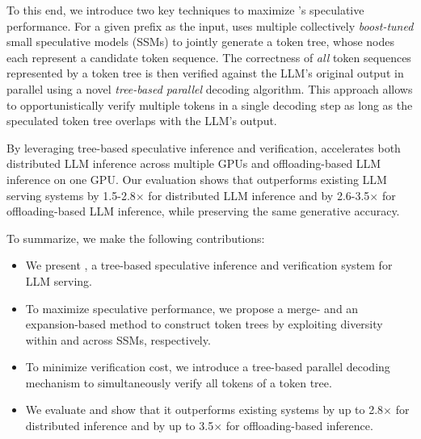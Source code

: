 To this end, we introduce two key techniques to maximize \sys's speculative performance. 
For a given prefix as the input, \Sys uses multiple collectively {\em boost-tuned} small speculative models (SSMs) to jointly generate a token tree, whose nodes each represent a candidate token sequence.
The correctness of {\em all} token sequences represented by a token tree is then verified against the LLM's original output in parallel using a novel {\em tree-based parallel} decoding algorithm.
This approach allows \Sys to opportunistically verify multiple tokens in a single decoding step as long as the speculated token tree overlaps with the LLM's output.
\fi 

By leveraging tree-based speculative inference and verification, \Sys accelerates both distributed LLM inference across multiple GPUs and offloading-based LLM inference on one GPU.
Our evaluation shows that \Sys outperforms existing LLM serving systems by 1.5-2.8$\times$ for distributed LLM inference and by 2.6-3.5$\times$ for offloading-based LLM inference, while preserving the same generative accuracy.
%

To summarize, we make the following contributions:
\begin{itemize}
    \item We present \sys, a tree-based speculative inference and verification system for LLM serving.
    \item To maximize speculative performance, we propose a merge- and an expansion-based method to construct token trees by exploiting diversity within and across SSMs, respectively.
    \item To minimize verification cost, we introduce a tree-based parallel decoding mechanism to simultaneously verify all tokens of a token tree.
    \item We evaluate \sys and show that it outperforms existing systems by up to 2.8$\times$ for distributed inference and by up to 3.5$\times$ for offloading-based inference.
\end{itemize}


